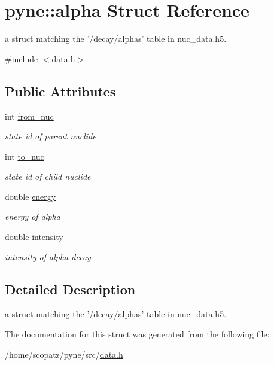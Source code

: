 \hypertarget{structpyne_1_1alpha}{\section{pyne\-:\-:alpha Struct Reference}
\label{structpyne_1_1alpha}
}


a struct matching the '/decay/alphas' table in nuc\-\_\-data.\-h5.  




{\ttfamily \#include $<$data.\-h$>$}

\subsection*{Public Attributes}
\begin{DoxyCompactItemize}
\item 
\hypertarget{structpyne_1_1alpha_af41fd4e97378d30f3fbc9f01999b2d2a}{int \hyperlink{structpyne_1_1alpha_af41fd4e97378d30f3fbc9f01999b2d2a}{from\-\_\-nuc}}\label{structpyne_1_1alpha_af41fd4e97378d30f3fbc9f01999b2d2a}

\begin{DoxyCompactList}\small\item\em state id of parent nuclide \end{DoxyCompactList}\item 
\hypertarget{structpyne_1_1alpha_ab099ce46072d7022caf1a49de2e0974b}{int \hyperlink{structpyne_1_1alpha_ab099ce46072d7022caf1a49de2e0974b}{to\-\_\-nuc}}\label{structpyne_1_1alpha_ab099ce46072d7022caf1a49de2e0974b}

\begin{DoxyCompactList}\small\item\em state id of child nuclide \end{DoxyCompactList}\item 
\hypertarget{structpyne_1_1alpha_a5f1aa6a1d0e8c02a0967ee160e35fdb2}{double \hyperlink{structpyne_1_1alpha_a5f1aa6a1d0e8c02a0967ee160e35fdb2}{energy}}\label{structpyne_1_1alpha_a5f1aa6a1d0e8c02a0967ee160e35fdb2}

\begin{DoxyCompactList}\small\item\em energy of alpha \end{DoxyCompactList}\item 
\hypertarget{structpyne_1_1alpha_a56e40c800fbe36f1d62113ddf4c162e7}{double \hyperlink{structpyne_1_1alpha_a56e40c800fbe36f1d62113ddf4c162e7}{intensity}}\label{structpyne_1_1alpha_a56e40c800fbe36f1d62113ddf4c162e7}

\begin{DoxyCompactList}\small\item\em intensity of alpha decay \end{DoxyCompactList}\end{DoxyCompactItemize}


\subsection{Detailed Description}
a struct matching the '/decay/alphas' table in nuc\-\_\-data.\-h5. 

The documentation for this struct was generated from the following file\-:\begin{DoxyCompactItemize}
\item 
/home/scopatz/pyne/src/\hyperlink{data_8h}{data.\-h}\end{DoxyCompactItemize}
